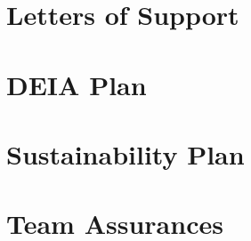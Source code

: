 \documentclass[12pt]{article}
\begin{document}
\section{Letters of Support}


\section{DEIA Plan}



\section{Sustainability Plan}

\section{Team Assurances}
\end{document}
